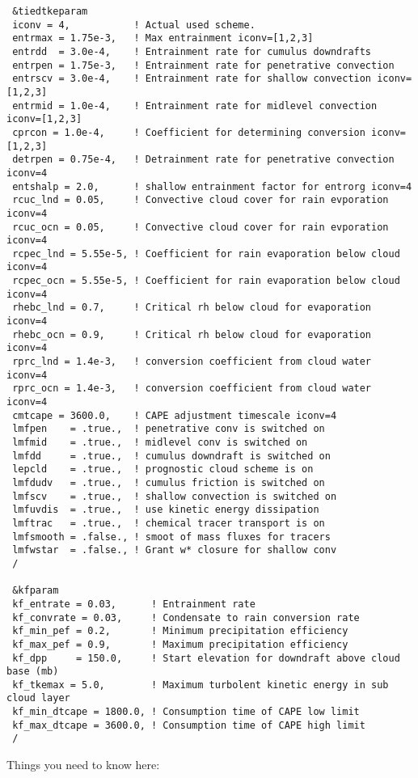 {\begin{Verbatim}
 &tiedtkeparam
 iconv = 4,           ! Actual used scheme.
 entrmax = 1.75e-3,   ! Max entrainment iconv=[1,2,3]
 entrdd  = 3.0e-4,    ! Entrainment rate for cumulus downdrafts
 entrpen = 1.75e-3,   ! Entrainment rate for penetrative convection
 entrscv = 3.0e-4,    ! Entrainment rate for shallow convection iconv=[1,2,3]
 entrmid = 1.0e-4,    ! Entrainment rate for midlevel convection iconv=[1,2,3]
 cprcon = 1.0e-4,     ! Coefficient for determining conversion iconv=[1,2,3]
 detrpen = 0.75e-4,   ! Detrainment rate for penetrative convection iconv=4
 entshalp = 2.0,      ! shallow entrainment factor for entrorg iconv=4
 rcuc_lnd = 0.05,     ! Convective cloud cover for rain evporation iconv=4
 rcuc_ocn = 0.05,     ! Convective cloud cover for rain evporation iconv=4
 rcpec_lnd = 5.55e-5, ! Coefficient for rain evaporation below cloud iconv=4
 rcpec_ocn = 5.55e-5, ! Coefficient for rain evaporation below cloud iconv=4
 rhebc_lnd = 0.7,     ! Critical rh below cloud for evaporation iconv=4
 rhebc_ocn = 0.9,     ! Critical rh below cloud for evaporation iconv=4
 rprc_lnd = 1.4e-3,   ! conversion coefficient from cloud water iconv=4
 rprc_ocn = 1.4e-3,   ! conversion coefficient from cloud water iconv=4
 cmtcape = 3600.0,    ! CAPE adjustment timescale iconv=4
 lmfpen    = .true.,  ! penetrative conv is switched on
 lmfmid    = .true.,  ! midlevel conv is switched on
 lmfdd     = .true.,  ! cumulus downdraft is switched on
 lepcld    = .true.,  ! prognostic cloud scheme is on
 lmfdudv   = .true.,  ! cumulus friction is switched on
 lmfscv    = .true.,  ! shallow convection is switched on
 lmfuvdis  = .true.,  ! use kinetic energy dissipation
 lmftrac   = .true.,  ! chemical tracer transport is on
 lmfsmooth = .false., ! smoot of mass fluxes for tracers
 lmfwstar  = .false., ! Grant w* closure for shallow conv
 /

 &kfparam
 kf_entrate = 0.03,      ! Entrainment rate
 kf_convrate = 0.03,     ! Condensate to rain conversion rate
 kf_min_pef = 0.2,       ! Minimum precipitation efficiency
 kf_max_pef = 0.9,       ! Maximum precipitation efficiency
 kf_dpp     = 150.0,     ! Start elevation for downdraft above cloud base (mb)
 kf_tkemax = 5.0,        ! Maximum turbolent kinetic energy in sub cloud layer
 kf_min_dtcape = 1800.0, ! Consumption time of CAPE low limit
 kf_max_dtcape = 3600.0, ! Consumption time of CAPE high limit
 /
\end{Verbatim}
}

Things you need to know here:

